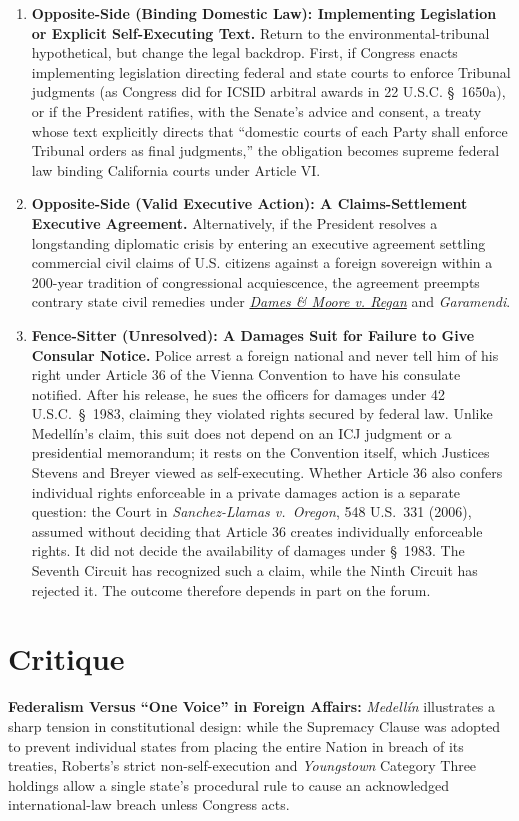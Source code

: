 \documentclass[12pt]{article}
\begin{document}
\begin{enumerate}
\item \textbf{Opposite-Side (Binding Domestic Law): Implementing Legislation or Explicit Self-Executing Text.} Return to the environmental-tribunal hypothetical, but change the legal backdrop. First, if Congress enacts implementing legislation directing federal and state courts to enforce Tribunal judgments (as Congress did for ICSID arbitral awards in 22 U.S.C. \S~1650a), or if the President ratifies, with the Senate's advice and consent, a treaty whose text explicitly directs that ``domestic courts of each Party shall enforce Tribunal orders as final judgments,'' the obligation becomes supreme federal law binding California courts under Article VI.

\item \textbf{Opposite-Side (Valid Executive Action): A Claims-Settlement Executive Agreement.} Alternatively, if the President resolves a longstanding diplomatic crisis by entering an executive agreement settling commercial civil claims of U.S. citizens against a foreign sovereign within a 200-year tradition of congressional acquiescence, the agreement preempts contrary state civil remedies under \href{https://supreme.justia.com/cases/federal/us/453/654/}{\textit{Dames \& Moore v. Regan}} and \textit{Garamendi}.

\item \textbf{Fence-Sitter (Unresolved): A Damages Suit for Failure to Give Consular Notice.} Police arrest a foreign national and never tell him of his right under Article 36 of the Vienna Convention to have his consulate notified. After his release, he sues the officers for damages under 42 U.S.C.\ \S~1983, claiming they violated rights secured by federal law. Unlike Medell\'{i}n's claim, this suit does not depend on an ICJ judgment or a presidential memorandum; it rests on the Convention itself, which Justices Stevens and Breyer viewed as self-executing. Whether Article 36 also confers individual rights enforceable in a private damages action is a separate question: the Court in \textit{Sanchez-Llamas v.\ Oregon}, 548 U.S.\ 331 (2006), assumed without deciding that Article 36 creates individually enforceable rights. It did not decide the availability of damages under \S~1983. The Seventh Circuit has recognized such a claim, while the Ninth Circuit has rejected it. The outcome therefore depends in part on the forum.

\end{enumerate}

\section{Critique}
\textbf{Federalism Versus ``One Voice'' in Foreign Affairs:} \textit{Medell\'{i}n} illustrates a sharp tension in constitutional design: while the Supremacy Clause was adopted to prevent individual states from placing the entire Nation in breach of its treaties, Roberts's strict non-self-execution and \textit{Youngstown} Category Three holdings allow a single state's procedural rule to cause an acknowledged international-law breach unless Congress acts.
\end{document}
